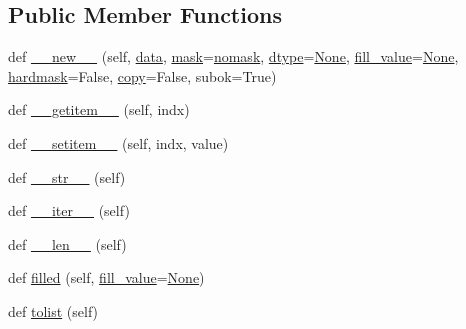 \subsection*{Public Member Functions}
\begin{DoxyCompactItemize}
\item 
def \hyperlink{classnumpy_1_1ma_1_1core_1_1mvoid_a90e35d035fa17ef1dbe3ce1b414677d7}{\+\_\+\+\_\+new\+\_\+\+\_\+} (self, \hyperlink{classnumpy_1_1ma_1_1core_1_1MaskedArray_a2d6c6c9dbd568a0ea5140111887cf652}{data}, \hyperlink{classnumpy_1_1ma_1_1core_1_1MaskedArray_a7ef4d822649ddda22965ba79c54e0afc}{mask}=\hyperlink{namespacenumpy_1_1ma_1_1core_abafbbb38c7afc60936cc5a55fa23ecfa}{nomask}, \hyperlink{classnumpy_1_1ma_1_1core_1_1MaskedArray_acaf5e9f1356ae9652fc4eddef5878b18}{dtype}=\hyperlink{namespacenumpy_1_1ma_1_1core_a647ee1848dfa3692fe35a663a2aa40b3}{None}, \hyperlink{classnumpy_1_1ma_1_1core_1_1MaskedArray_a4163711b2717238c0493739e3afea1bd}{fill\+\_\+value}=\hyperlink{namespacenumpy_1_1ma_1_1core_a647ee1848dfa3692fe35a663a2aa40b3}{None}, \hyperlink{classnumpy_1_1ma_1_1core_1_1MaskedArray_a673554fc5a945048b3caa282d191072e}{hardmask}=False, \hyperlink{classnumpy_1_1ma_1_1core_1_1MaskedArray_a2d8023d4e0400e07cbffbc8a60e0a418}{copy}=False, subok=True)
\item 
def \hyperlink{classnumpy_1_1ma_1_1core_1_1mvoid_a9a8326bef4d36b355d9a59add90be30e}{\+\_\+\+\_\+getitem\+\_\+\+\_\+} (self, indx)
\item 
def \hyperlink{classnumpy_1_1ma_1_1core_1_1mvoid_a6228f629c7618fc5a0c58dadb3e5e66e}{\+\_\+\+\_\+setitem\+\_\+\+\_\+} (self, indx, value)
\item 
def \hyperlink{classnumpy_1_1ma_1_1core_1_1mvoid_a60bf4b8f2899dfe9f9b15e90e8e7c5fb}{\+\_\+\+\_\+str\+\_\+\+\_\+} (self)
\item 
def \hyperlink{classnumpy_1_1ma_1_1core_1_1mvoid_aa85116bacfc8fc1fc028039a9637c190}{\+\_\+\+\_\+iter\+\_\+\+\_\+} (self)
\item 
def \hyperlink{classnumpy_1_1ma_1_1core_1_1mvoid_a61c15faff554c267735e0b5dbc992189}{\+\_\+\+\_\+len\+\_\+\+\_\+} (self)
\item 
def \hyperlink{classnumpy_1_1ma_1_1core_1_1mvoid_ab3fe20d8cca87e4a47e74b157414d8da}{filled} (self, \hyperlink{classnumpy_1_1ma_1_1core_1_1MaskedArray_a4163711b2717238c0493739e3afea1bd}{fill\+\_\+value}=\hyperlink{namespacenumpy_1_1ma_1_1core_a647ee1848dfa3692fe35a663a2aa40b3}{None})
\item 
def \hyperlink{classnumpy_1_1ma_1_1core_1_1mvoid_ae64de3cb52e7a247ccfada2c3180006d}{tolist} (self)
\end{DoxyCompactItemize}
